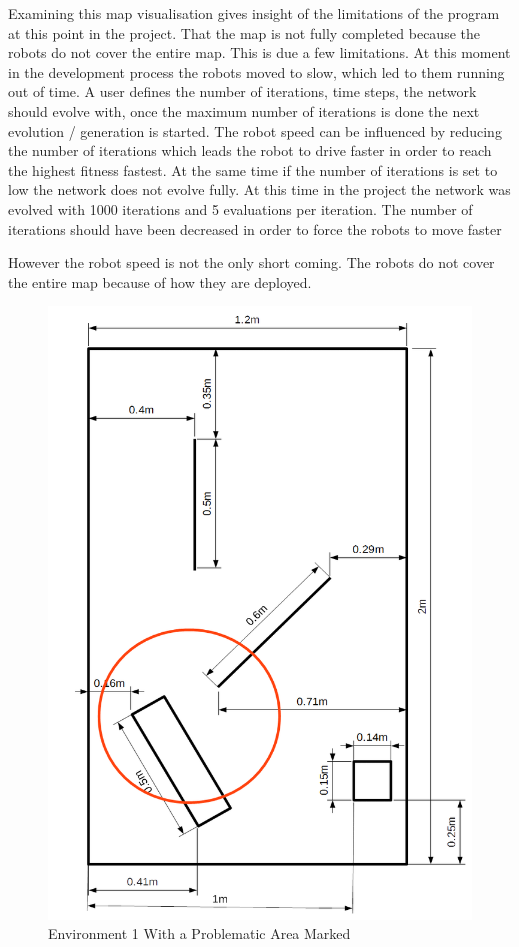 Examining this map visualisation gives insight of the limitations of the program at this point in the project.
That the map is not fully completed because the robots do not cover the entire map. This is due a few limitations. At this moment in the development process the robots moved to slow, which led to them running out of time. 
A user defines the number of iterations, time steps,  the network should evolve with, once the maximum number of iterations is done the next evolution / generation is started.
The robot speed can be influenced by reducing the number of iterations which leads the robot to drive faster in order to reach the highest fitness fastest. At the same time if the number of iterations is set to low the network does not evolve fully. 
At this time in the project the network was evolved with 1000 iterations and 5 evaluations per iteration.  The number of iterations should have been decreased in order to force the robots to move faster 

However the robot speed is not the only short coming. The robots do not cover the entire map because of how they are deployed. 

\begin{figure}[h]
\centering
\includegraphics[scale=0.4]{Chapter4/images/environment_marked1}
\caption{Environment 1 With a Problematic Area Marked}
\label{fig:enviro_marked1}
\end{figure}

